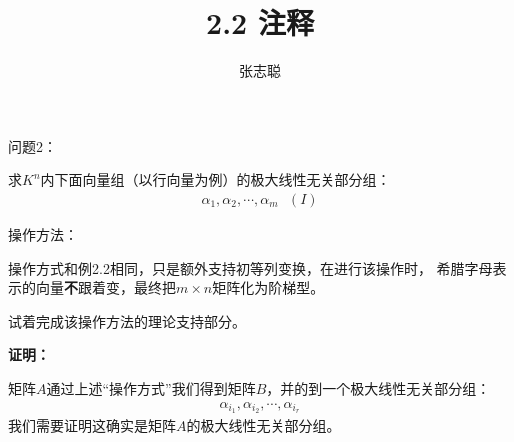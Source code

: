 \documentclass{article}
\begin{document}
\title{2.2 注释}
\author{张志聪}
\maketitle

\begin{zremark}
  问题2：

  求$K^n$内下面向量组（以行向量为例）的极大线性无关部分组：
  \begin{align*}
    \alpha_1, \alpha_2, \cdots, \alpha_m \ \ \ (I)
  \end{align*}

  操作方法：

  操作方式和例2.2相同，只是额外支持初等列变换，在进行该操作时，
  希腊字母表示的向量\textbf{不}跟着变，最终把$m \times n$矩阵化为阶梯型。

  试着完成该操作方法的理论支持部分。
\end{zremark}

\textbf{证明：}

矩阵$A$通过上述“操作方式”我们得到矩阵$B$，并的到一个极大线性无关部分组：
\begin{align}
  \alpha_{i_1}, \alpha_{i_2}, \cdots, \alpha_{i_r}
\end{align}
我们需要证明这确实是矩阵$A$的极大线性无关部分组。
\end{document}
